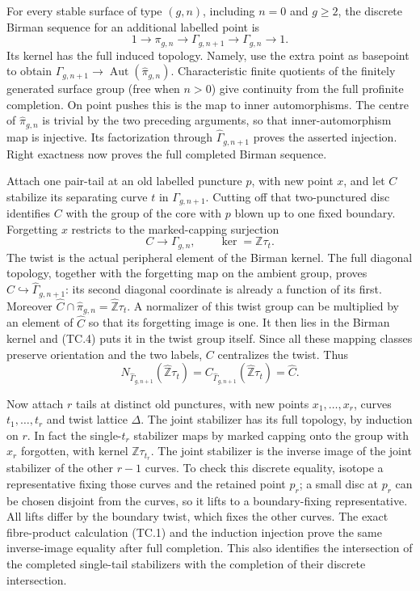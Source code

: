 For every stable surface of type $(g,n)$, including $n=0$ and $g\geq2$,
the discrete Birman sequence for an additional labelled point is
\[
1\longrightarrow\pi_{g,n}\longrightarrow\Gamma_{g,n+1}
                     \longrightarrow\Gamma_{g,n}\longrightarrow1.
\]
Its kernel has the full induced topology.  Namely, use the extra point
as basepoint to obtain
$\Gamma_{g,n+1}\to\operatorname{Aut}(\widehat\pi_{g,n})$.
Characteristic finite quotients of the finitely generated surface
group (free when $n>0$) give continuity from the full profinite completion.  On
point pushes this is the map to inner automorphisms.  The centre of
$\widehat\pi_{g,n}$ is trivial by the two preceding arguments, so that
inner-automorphism map is injective.  Its factorization through
$\widehat\Gamma_{g,n+1}$ proves the asserted injection.  Right
exactness now proves the full completed Birman sequence.

Attach one pair-tail at an old labelled puncture $p$, with new point
$x$, and let $C$ stabilize its separating curve $t$ in
$\Gamma_{g,n+1}$.  Cutting off that two-punctured disc identifies $C$
with the group of the core with $p$ blown up to one fixed boundary.
Forgetting $x$ restricts to the marked-capping surjection
\[
             C\longrightarrow\Gamma_{g,n},\qquad
                    \ker=\mathbb Z\tau_t.
\]
The twist is the actual peripheral element of the Birman kernel.
The full diagonal topology, together with the forgetting map on the
ambient group, proves $\widehat C\hookrightarrow
\widehat\Gamma_{g,n+1}$: its second diagonal coordinate is already
a function of its first.  Moreover
$\widehat C\cap\widehat\pi_{g,n}=\widehat{\mathbb Z}\tau_t$.
A normalizer of this twist group can be multiplied by an element of
$\widehat C$ so that its forgetting image is one.  It then lies in the
Birman kernel and (TC.4) puts it in the twist group itself.  Since all
these mapping classes preserve orientation and the two labels, $C$
centralizes the twist.  Thus
\[
 N_{\widehat\Gamma_{g,n+1}}(\widehat{\mathbb Z}\tau_t)
 =C_{\widehat\Gamma_{g,n+1}}(\widehat{\mathbb Z}\tau_t)
 =\widehat C.                                                \tag{TC.5}
\]

Now attach $r$ tails at distinct old punctures, with new points
$x_1,\ldots,x_r$, curves $t_1,\ldots,t_r$ and twist lattice $\Delta$.
The joint stabilizer has its full topology, by induction on $r$.
In fact the single-$t_r$ stabilizer maps by marked capping onto the
group with $x_r$ forgotten, with kernel $\mathbb Z\tau_{t_r}$.
The joint stabilizer is the inverse image of the joint stabilizer of
the other $r-1$ curves.  To check this discrete equality, isotope a
representative fixing those curves and the retained point $p_r$;
a small disc at $p_r$ can be chosen disjoint from the curves, so it
lifts to a boundary-fixing representative.  All lifts differ by the
boundary twist, which fixes the other curves.  The exact fibre-product
calculation (TC.1) and the induction injection prove the same
inverse-image equality after full completion.  This also identifies
the intersection of the completed single-tail stabilizers with the
completion of their discrete intersection.

